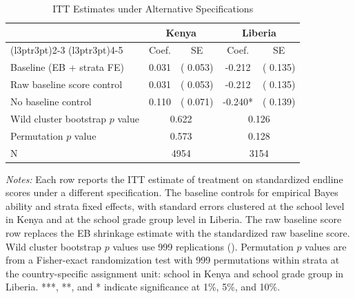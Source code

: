 \begin{table}[H]
\centering
\caption{ITT Estimates under Alternative Specifications}
\label{tab:spec_robust}
\begin{threeparttable}
\fontsize{9}{11}\selectfont
\begin{tabular}[t]{lcccc}
\toprule
 & \multicolumn{2}{c}{Kenya} & \multicolumn{2}{c}{Liberia} \\
\cmidrule(l{3pt}r{3pt}){2-3} \cmidrule(l{3pt}r{3pt}){4-5}
 & Coef. & SE & Coef. & SE \\
\midrule
Baseline (EB + strata FE) &   0.031 & (  0.053) &  -0.212 & (  0.135) \\
\addlinespace
Raw baseline score control &   0.031 & (  0.053) &  -0.212 & (  0.135) \\
\addlinespace
No baseline control &   0.110 & (  0.071) &  -0.240* & (  0.139) \\
\addlinespace
\midrule
Wild cluster bootstrap $p$ value & \multicolumn{2}{c}{0.622} & \multicolumn{2}{c}{0.126} \\
Permutation $p$ value & \multicolumn{2}{c}{0.573} & \multicolumn{2}{c}{0.128} \\
\addlinespace
N & \multicolumn{2}{c}{4954} & \multicolumn{2}{c}{3154} \\
\bottomrule
\end{tabular}
\begin{tablenotes}
\footnotesize
\item \textit{Notes:} Each row reports the ITT estimate of treatment on standardized endline scores under a different specification. The baseline controls for empirical Bayes ability and strata fixed effects, with standard errors clustered at the school level in Kenya and at the school grade group level in Liberia. The raw baseline score row replaces the EB shrinkage estimate with the standardized raw baseline score. Wild cluster bootstrap $p$ values use 999 replications (\citealt{cameron2008bootstrap}). Permutation $p$ values are from a Fisher-exact randomization test with 999 permutations within strata at the country-specific assignment unit: school in Kenya and school grade group in Liberia. ***, **, and * indicate significance at 1\%, 5\%, and 10\%.
\end{tablenotes}
\end{threeparttable}
\end{table}
